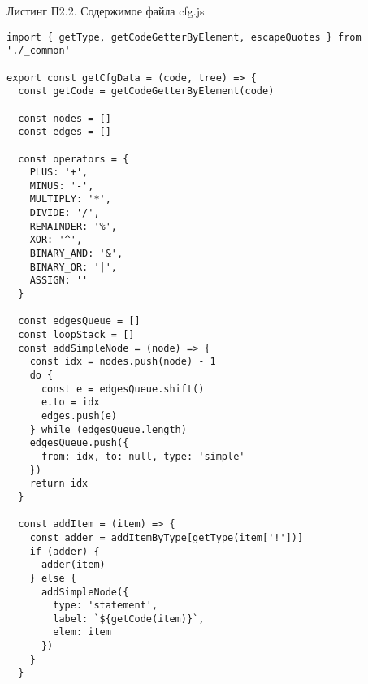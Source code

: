 \begin{flushright}
Листинг П2.2. Содержимое файла cfg.js
\end{flushright}

\begin{lstlisting}
import { getType, getCodeGetterByElement, escapeQuotes } from './_common'

export const getCfgData = (code, tree) => {
  const getCode = getCodeGetterByElement(code)

  const nodes = []
  const edges = []

  const operators = {
    PLUS: '+',
    MINUS: '-',
    MULTIPLY: '*',
    DIVIDE: '/',
    REMAINDER: '%',
    XOR: '^',
    BINARY_AND: '&',
    BINARY_OR: '|',
    ASSIGN: ''
  }

  const edgesQueue = []
  const loopStack = []
  const addSimpleNode = (node) => {
    const idx = nodes.push(node) - 1
    do {
      const e = edgesQueue.shift()
      e.to = idx
      edges.push(e)
    } while (edgesQueue.length)
    edgesQueue.push({
      from: idx, to: null, type: 'simple'
    })
    return idx
  }

  const addItem = (item) => {
    const adder = addItemByType[getType(item['!'])]
    if (adder) {
      adder(item)
    } else {
      addSimpleNode({
        type: 'statement',
        label: `${getCode(item)}`,
        elem: item
      })
    }
  }


\end{lstlisting}
